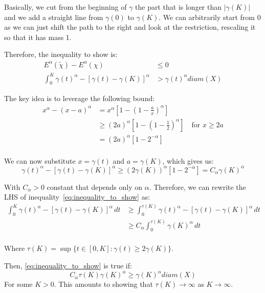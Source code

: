 \documentclass[12pt,a4paper]{article}
\numberwithin{equation}{section}
\theoremstyle{mytheorem}
\theoremstyle{myremark}
\theoremstyle{myparagraph}
\begin{document}
    Basically, we cut from the beginning of $\gamma$ the part that is longer than $|\gamma(K)|$ and we add a straight line from
    $\gamma(0)$ to $\gamma(K)$. We can arbitrarily start from 0 as we can just shift the path to the right and look at the restriction,
    rescaling it so that it has mass 1.

    Therefore, the inequality to show is:
    \begin{align}
        E^\alpha(\tilde{\chi}) - E^\alpha(\chi) &\le 0  \\
        \int_0^K \gamma(t)^\alpha - \left[ \gamma(t) - \gamma(K) \right] ^ \alpha &> \gamma(t)^\alpha diam(X) \label{eq:inequality_to_show}
    \end{align}

    The key idea is to leverage the following bound:
    \begin{align}
        x^\alpha - (x - a)^\alpha &= x^\alpha \left[ 1 - \left( 1 - \frac{a}{x} \right)^\alpha\right] \\
        &\ge (2a)^\alpha \left[ 1 - \left( 1 - \frac{1}{2} \right)^\alpha\right] \quad \text{for } x \ge 2a \\
        &= (2a)^\alpha \left[ 1 - 2^{-\alpha} \right] \\
    \end{align}

    We can now substitute $x=\gamma(t)$ and $a=\gamma(K)$, which gives us:
    \begin{equation}
        \gamma(t)^\alpha - \left[ \gamma(t) - \gamma(K) \right] ^ \alpha \ge (2\gamma(K))^\alpha \left[ 1 - 2^{-\alpha} \right] = C_\alpha \gamma(K)^\alpha        
    \end{equation}

    With $C_\alpha > 0$ constant that depends only on $\alpha$.
    Therefore, we can rewrite the LHS of inequality~\ref{eq:inequality_to_show} as:
    \begin{align}
        \int_0^K \gamma(t)^\alpha - \left[ \gamma(t) - \gamma(K) \right] ^ \alpha  \, dt &\ge \int_0^{\tau(K)} \gamma(t)^\alpha - \left[ \gamma(t) - \gamma(K) \right] ^ \alpha \, dt \\
        &\ge C_\alpha \int_0^{\tau(K)} \gamma(K)^\alpha \, dt \\
    \end{align}

    Where $\tau(K) = \sup \{ t \in [0,K] : \gamma(t) \ge 2\gamma(K) \}$.

    Then, \ref{eq:inequality_to_show} is true if:
    \begin{equation}
        C_\alpha \tau(K) \gamma(K)^\alpha \ge \gamma(K)^\alpha diam(X)
    \end{equation}
    For some $K > 0$. This amounts to showing that $\tau(K) \to \infty$ as $K \to \infty$.
\end{document}
